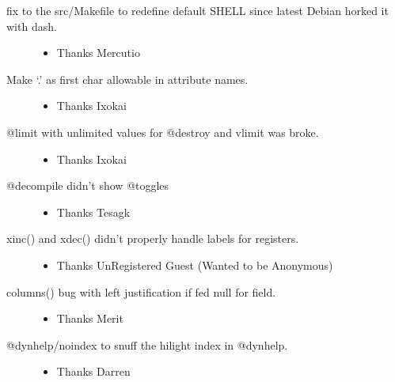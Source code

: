 \documentclass[letterpaper,10pt,english]{sphinxmanual}
\begin{document}
\begin{description}
\begin{itemize}
\end{itemize}

\item[{fix to the src/Makefile to redefine default SHELL since latest Debian horked it with dash.}] \leavevmode\begin{itemize}
\item {} 
\sphinxAtStartPar
Thanks Mercutio

\end{itemize}

\item[{Make ‘.’ as first char allowable in attribute names.}] \leavevmode\begin{itemize}
\item {} 
\sphinxAtStartPar
Thanks Ixokai

\end{itemize}

\item[{@limit with unlimited values for @destroy and vlimit was broke.}] \leavevmode\begin{itemize}
\item {} 
\sphinxAtStartPar
Thanks Ixokai

\end{itemize}

\item[{@decompile didn’t show @toggles}] \leavevmode\begin{itemize}
\item {} 
\sphinxAtStartPar
Thanks Tesagk

\end{itemize}

\item[{xinc() and xdec() didn’t properly handle labels for registers.}] \leavevmode\begin{itemize}
\item {} 
\sphinxAtStartPar
Thanks UnRegistered Guest (Wanted to be Anonymous)

\end{itemize}

\item[{columns() bug with left justification if fed null for field.}] \leavevmode\begin{itemize}
\item {} 
\sphinxAtStartPar
Thanks Merit

\end{itemize}

\item[{@dynhelp/noindex to snuff the hilight index in @dynhelp.}] \leavevmode\begin{itemize}
\item {} 
\sphinxAtStartPar
Thanks Darren


\end{itemize}
\end{description}
\end{document}
